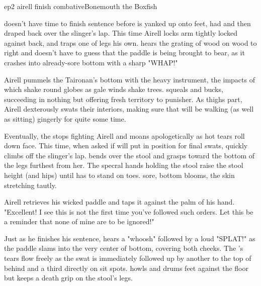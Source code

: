 \documentclass{book}
\begin{document}
\begin{childnode}{ep2 airell finish combative}{Bonemouth the Boxfish}

    \name{} doesn't have time to finish \hisher{} sentence before \heshe{} is yanked up onto \hisher{} feet, had \hisher{}  and then
        draped back over the slinger's lap. This time Airell locks \names{} arm tightly locked against \hisher{} back, and traps one of \names{} legs his own. \name{} hears the grating of wood on 
        wood to \hisher{} right and doesn't have to guess that the paddle is being brought to bear, as it crashes into \hisher{} already-sore bottom with a sharp "WHAP!"

        Airell pummels the Taironan's bottom with the heavy instrument, the impacts of which shake \hisher{} round globes as gale winds shake trees. \name{} squeals and bucks, succeeding in nothing 
        but offering fresh territory to \hisher{} punisher. As \hisher{} thighs part, Airell dexterously swats their interiors, making sure that \name{} will be walking (as well as sitting) gingerly 
        for quite some time. 

        Eventually, the \boygirl{} stops fighting Airell and moans apologetically as hot tears roll down \hisher{} face. This time, when asked if \heshe{} will put \himselfherself{} in position for 
        \hisher{} final swats, \heshe{} quickly climbs off the slinger's lap. \HeShe{} bends over the stool and grasps toward the bottom of the legs furthest from her. The specral hands holding the
        stool raise the stool height (and \names{} hips) until \name{} has to stand on \hisher{} toes. \names{} sore, \bumadj{} bottom blooms, the skin stretching tautly. 

Airell retrieves his wicked paddle and taps it against the palm of his hand. "Excellent! I see this is not the first time you've followed such orders. Let this be a reminder that none of mine are to 
be ignored!" 

Just as he finishes his sentence, \name{} hears a "whoosh" followed by a loud "SPLAT!" as the paddle slams into the very center of \hisher{} bottom, covering both cheeks. The \boygirl{}'s tears flow 
freely as the swat is immediately followed up by another to the top of \hisher{} behind and a third directly on \hisher{} sit spots. \name{} howls and drums \hisher{} feet against the floor but 
keeps a death grip on the stool's legs. 


\end{childnode}
\end{document}
